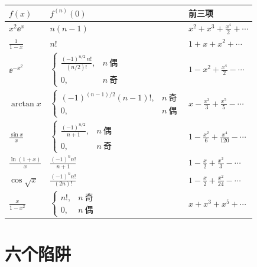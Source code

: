 \documentclass[11pt,UTF8]{ctexart}
\begin{document}
\begin{center}
\renewcommand{\arraystretch}{1.35}
\begin{tabular}{@{}p{2.5cm}p{6.9cm}p{4.6cm}@{}}
\toprule
\textbf{$f(x)$} & \textbf{$f^{(n)}(0)$} & \textbf{前三项} \\
\midrule
$x^{2}\ee^{x}$ & $n(n-1)$ & $x^{2}+x^{3}+\frac{x^{4}}{2}+\cdots$ \\[1pt]
$\frac{1}{1-x}$ & $n!$ & $1+x+x^{2}+\cdots$ \\[1pt]
$\ee^{-x^{2}}$ & $\begin{cases}\frac{(-1)^{n/2}\,n!}{(n/2)!}, & n\ \text{偶}\\[2pt] 0, & n\ \text{奇}\end{cases}$ & $1-x^{2}+\frac{x^{4}}{2}-\cdots$ \\[1pt]
$\arctan x$ & $\begin{cases}(-1)^{(n-1)/2}(n-1)!, & n\ \text{奇}\\[2pt] 0, & n\ \text{偶}\end{cases}$ & $x-\frac{x^{3}}{3}+\frac{x^{5}}{5}-\cdots$ \\[1pt]
$\frac{\sin x}{x}$ & $\begin{cases}\frac{(-1)^{n/2}}{n+1}, & n\ \text{偶}\\[2pt] 0, & n\ \text{奇}\end{cases}$ & $1-\frac{x^{2}}{6}+\frac{x^{4}}{120}-\cdots$ \\[1pt]
$\frac{\ln(1+x)}{x}$ & $\frac{(-1)^{n}n!}{n+1}$ & $1-\frac{x}{2}+\frac{x^{2}}{3}-\cdots$ \\[1pt]
$\cos\sqrt{x}$ & $\frac{(-1)^{n}n!}{(2n)!}$ & $1-\frac{x}{2}+\frac{x^{2}}{24}-\cdots$ \\[1pt]
$\frac{x}{1-x^{2}}$ & $\begin{cases}n!, & n\ \text{奇}\\[2pt] 0, & n\ \text{偶}\end{cases}$ & $x+x^{3}+x^{5}+\cdots$ \\
\bottomrule
\end{tabular}
\end{center}


\section{六个陷阱}
\end{document}
